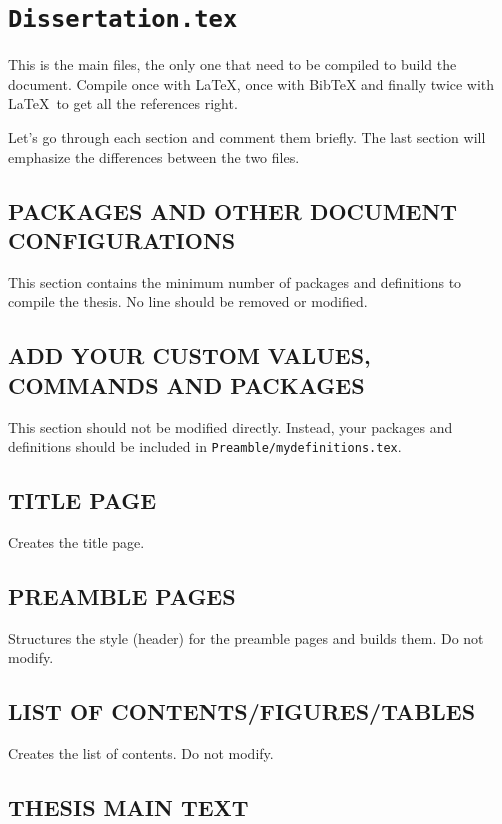 \section{\texttt{Dissertation.tex}}

This is the main files, the only one that need to be compiled to build the document. Compile once with \LaTeX, once with BibTeX and finally twice with \LaTeX\ to get all the references right.

Let's go through each section and comment them briefly. \cite{App88} The last section will emphasize the differences between the two files.\cite{C_grammar}

\subsection{PACKAGES AND OTHER DOCUMENT CONFIGURATIONS}

This section contains the minimum number of packages and definitions to compile the thesis. No line should be removed or modified.

\subsection{ADD YOUR CUSTOM VALUES, COMMANDS AND PACKAGES}

This section should not be modified directly. Instead, your packages and definitions should be included in  \texttt{Preamble/mydefinitions.tex}.

\subsection{TITLE PAGE}

Creates the title page.

\subsection{PREAMBLE PAGES}

Structures the style (header) for the preamble pages and builds them. Do not modify.

\subsection{LIST OF CONTENTS/FIGURES/TABLES}

Creates the list of contents. Do not modify.

\subsection{THESIS MAIN TEXT}


